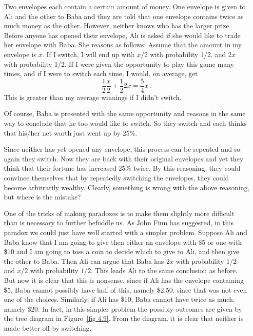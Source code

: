 \begin{example}\label{exam 4.3.4}
Two envelopes each contain a certain amount of money.  One envelope is given to Ali 
and the other to Baba and they are told that one envelope contains twice as much money
as the other.  However, neither knows who has the larger prize.  Before anyone has 
opened their envelope, Ali is asked if she would like to trade her envelope with Baba.
She reasons as follows:  Assume that the amount in my envelope is $x$.  If I switch,
I will end up with $x/2$ with probability 1/2, and $2x$ with probability 1/2.  If I were
given the opportunity to play this game many times, and if I were to switch each time, 
I would, on average, get
$$
\frac 12 \frac x2 + \frac 12 2x = \frac 54 x\ .
$$
This is greater than my average winnings if I didn't switch.  
\par
Of course, Baba is presented with the same opportunity and reasons in the same way 
to conclude that he too would like to switch.  So they switch and each thinks that 
his/her net worth just went up by 25\%.
\par
Since neither has yet opened any envelope, this process can be
repeated and so again they switch.  Now they are back with their original
envelopes and yet they think that their fortune has increased 25\% twice.
By this reasoning, they could convince themselves that by repeatedly switching the
envelopes, they could become arbitrarily wealthy.  Clearly, something is wrong with 
the above reasoning, but where is the mistake?
\par
One of the tricks of making paradoxes is to make them slightly more difficult
than is necessary to further befuddle us.  As John Finn has suggested, in this
paradox  we could just have well started with a simpler problem.  Suppose Ali and Baba know that 
I am going to give then either an envelope with \$5 or one with \$10 
and I am going to toss a coin to decide which to give to Ali, and then give the other to 
Baba.  Then Ali can argue that Baba has $2x$ with probability $1/2$ and $x/2$ with probability 
$1/2$.  This leads Ali to the same conclusion as before.   But now it is clear that this is 
nonsense, since if Ali has the envelope containing \$5, Baba cannot possibly have half of this, 
namely \$2.50, since that was not even one of the choices.  Similarly, if Ali has \$10, 
Baba cannot have twice as much, namely \$20. In fact, in this simpler problem the possibly 
outcomes are given by the tree diagram in Figure~\ref{fig 4.9}.
From the diagram, it is clear that neither is made better off by switching.
\end{example}

